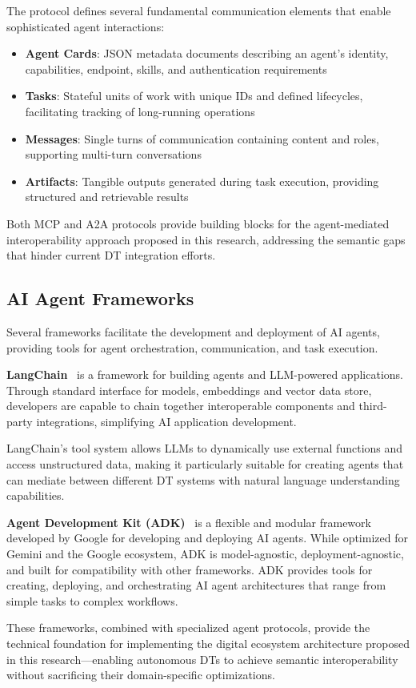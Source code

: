 The protocol defines several fundamental communication elements that enable sophisticated agent interactions:
\begin{itemize}
    \item \textbf{Agent Cards}: JSON metadata documents describing an agent's identity, capabilities, endpoint, skills, and authentication requirements
    \item \textbf{Tasks}: Stateful units of work with unique IDs and defined lifecycles, facilitating tracking of long-running operations
    \item \textbf{Messages}: Single turns of communication containing content and roles, supporting multi-turn conversations
    \item \textbf{Artifacts}: Tangible outputs generated during task execution, providing structured and retrievable results
\end{itemize}

Both MCP and A2A protocols provide building blocks for the agent-mediated interoperability approach proposed in this research,
    addressing the semantic gaps that hinder current DT integration efforts.

\subsection{AI Agent Frameworks}

Several frameworks facilitate the development and deployment of AI agents, providing tools for agent orchestration, communication, and task execution.

\textbf{LangChain}~\cite{LangChainOverview}
    is a framework for building agents and LLM-powered applications.
Through standard interface for models, embeddings and vector data store,
    developers are capable to chain together interoperable components and third-party integrations,
    simplifying AI application development. 

LangChain's tool system allows LLMs to dynamically use external functions and access unstructured data,
    making it particularly suitable for creating agents that can mediate between different DT systems with natural language understanding capabilities.

\textbf{Agent Development Kit (ADK)}~\cite{googleAgentDevelopmentKit}
    is a flexible and modular framework developed by Google for developing and deploying AI agents.
While optimized for Gemini and the Google ecosystem, ADK is model-agnostic, deployment-agnostic, and
    built for compatibility with other frameworks.
ADK provides tools for creating, deploying, and orchestrating AI agent architectures that range from simple tasks to complex workflows.

These frameworks, combined with specialized agent protocols, provide the
    technical foundation for implementing the digital ecosystem architecture proposed in this research—enabling
    autonomous DTs to achieve semantic interoperability without sacrificing their domain-specific optimizations.
